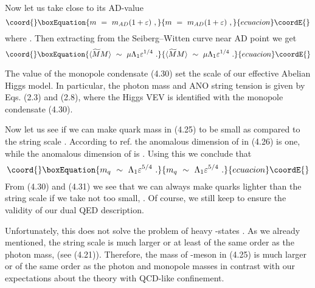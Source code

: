 \documentclass[a4paper,12pt]{article}
\begin{document}
Now let us take \coordHE{} close to its AD-value
\begin{equation}\coord{}\boxEquation{
m\ =\ m_{AD}(1+\varepsilon)\ ,
}{
m\ =\ m_{AD}(1+\varepsilon)\ ,
}{ecuacion}\coordE{}\end{equation}
where \coordHE{}. Then extracting \coordHE{} from the
Seiberg--Witten curve near AD point \cite{GVY} we get
\begin{equation}\coord{}\boxEquation{
\langle\widetilde MM\rangle\ \sim\ \mu \Lambda_1
\varepsilon^{1/4}\ .
}{
\langle\widetilde MM\rangle\ \sim\ \mu \Lambda_1
\varepsilon^{1/4}\ .
}{ecuacion}\coordE{}\end{equation}

The value of the monopole condensate (4.30) set the scale of our
effective Abelian Higgs model. In particular, the photon mass
and ANO string tension is given by Eqs. (2.3) and (2.8), where
the Higgs VEV  \coordHE{} is identified with the monopole condensate (4.30).

Now let us see if we can make quark mass in (4.25) to be small
as compared to the string scale \coordHE{}. According to ref.\cite{APSW} the anomalous
dimension of \coordHE{} in (4.26) is one, while the anomalous
dimension of \coordHE{} is \coordHE{}. Using this we conclude that
\begin{equation}\coord{}\boxEquation{
m_q\ \sim\ \Lambda_1\varepsilon^{5/4}\ .
}{
m_q\ \sim\ \Lambda_1\varepsilon^{5/4}\ .
}{ecuacion}\coordE{}\end{equation}
From (4.30) and (4.31) we see that we  can always make quarks
lighter than the string scale \coordHE{} if we take \myHighlight{$\mu $}\coordHE{}
not too small, \coordHE{}. Of course, we
still keep \coordHE{} to ensure the validity of our
dual QED description.

Unfortunately, this does not solve the problem of heavy
\coordHE{}-states .
 As we already mentioned, the string scale is much
larger or at least of the same order as  the photon mass,  (see (4.21)).
Therefore, the mass of \coordHE{}-meson in (4.25) is much larger
 or of the same order
as the photon and  monopole  masses in
contrast with our expectations about the theory with QCD-like
confinement.
\end{document}
